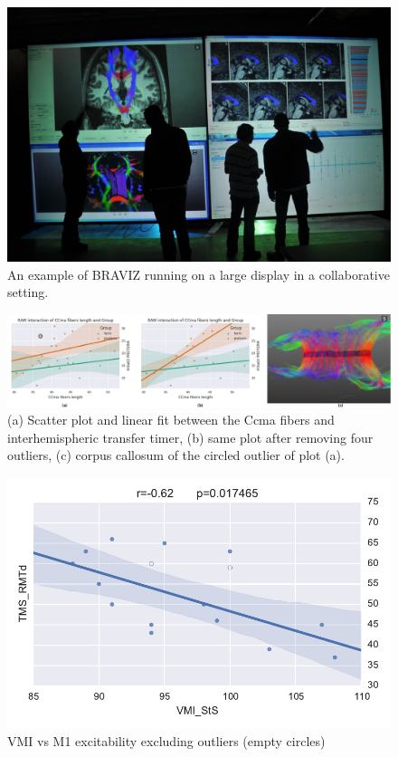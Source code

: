 \documentclass{frontiersHLTH}
\begin{document}
\begin{figure}
\begin{center}
\includegraphics[width=\linewidth]{imagine.jpg}
\end{center}
 \caption{\label{fig_imagine} An example of BRAVIZ running on a large display in a collaborative setting.}
\end{figure}


\begin{figure}
	\centering
		\includegraphics[width=\linewidth]{new_cyril_plot/three_panels_final.png}
	\caption{(a) Scatter plot and linear fit between the Ccma fibers and interhemispheric transfer timer, (b) same plot after removing four outliers, (c) corpus callosum of the circled outlier of plot (a).}
	\label{fig_cyril_1}
\end{figure}


\begin{figure}
	\centering
		\includegraphics[width=0.9\linewidth]{cyricl_corr_1}
	\caption{VMI vs M1 excitability excluding outliers (empty circles)}
	\label{fig_cyril_4}
\end{figure}
\end{document}
